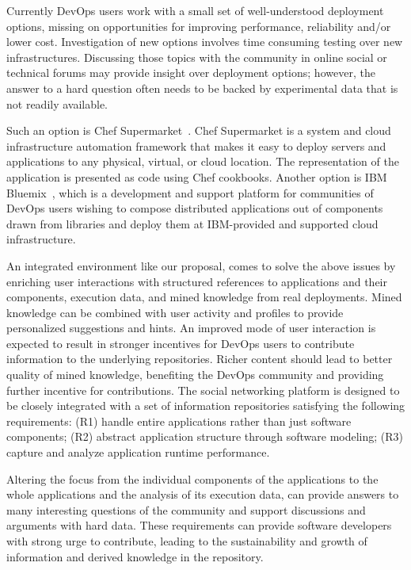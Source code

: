 Currently DevOps users work with a small set of well-understood deployment options, missing on opportunities for improving performance, reliability and/or lower cost. Investigation of new options involves time consuming testing over new infrastructures. Discussing those topics with the community in online social or technical forums may provide insight over deployment options; however, the answer to a hard question often needs to be backed by experimental data that is not readily
available. 

Such an option is Chef Supermarket~\cite{Chef_base}. Chef Supermarket is a system and cloud infrastructure automation framework that makes it easy to deploy servers and applications to any physical, virtual, or cloud location. The representation of the application is presented as code using Chef cookbooks. Another option is IBM Bluemix~\cite{Bluemix-dev}, which is a development and support platform for communities of DevOps users wishing to compose distributed applications out of components drawn from libraries and deploy them at IBM-provided and supported cloud infrastructure.
 
An integrated environment like our proposal, comes to solve the above issues by enriching user interactions with structured references to applications and their components, execution data, and mined knowledge from real deployments. Mined knowledge can be combined with user activity and profiles to provide personalized suggestions and hints.  An improved mode of user interaction is expected to result in stronger incentives for DevOps users to contribute information to the underlying repositories. Richer content should lead to better quality of mined knowledge, benefiting the DevOps community and providing further incentive for contributions.  The social networking platform is designed to be closely integrated with a set of information repositories satisfying the following requirements: 
(R1) handle entire applications rather than just software components; (R2) abstract application structure through software modeling; (R3) capture and analyze application runtime performance. 

Altering the focus from the individual components of the applications to the whole applications and the analysis of its execution data, can provide answers to many interesting questions of the community and support discussions and arguments with hard data. 
These requirements can provide software developers with strong urge to contribute, leading to the sustainability and growth of information and derived knowledge in the repository.

